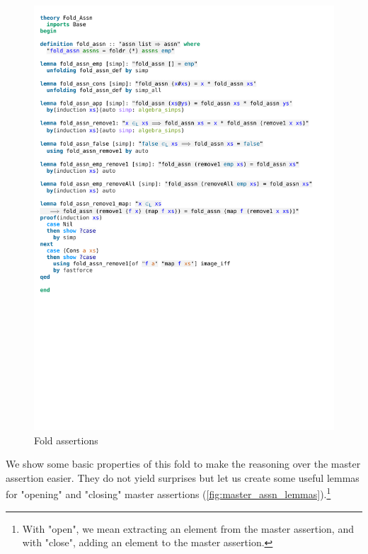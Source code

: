 \begin{figure}[htpb]
    \includegraphics[trim={0 26,3cm 0 2,3cm}, clip, width=1.00\textwidth]{figures/Theory_Fold_Assn.pdf}
    \caption[Fold assertions]{Fold assertions}
    \label{fig:fold_assn}
\end{figure}

\noindent We show some basic properties of this fold to make the reasoning over the master assertion easier. They do not yield surprises but let us create some useful lemmas for "opening" and "closing" master assertions (\autoref{fig:master_assn_lemmas}).\footnote{With "open", we mean extracting an element from the master assertion, and with "close", adding an element to the master assertion.}

